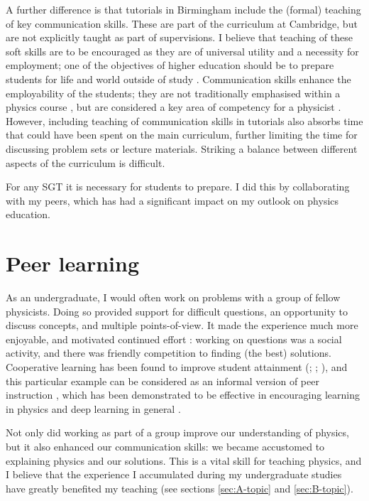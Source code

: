A further difference is that tutorials in Birmingham include the (formal) teaching of key communication skills. These are part of the curriculum at Cambridge, but are not explicitly taught as part of supervisions. %
I believe that teaching of these soft skills are to be encouraged as they are of universal utility and a necessity for employment; one of the objectives of higher education should be to prepare students for life and world outside of study \citep{Fallows2000,Harvey2000}. Communication skills enhance the employability of the students; they are not traditionally emphasised within a physics course \citep[cf.][]{Sharma2007}, but are considered a key area of competency for a physicist \citep{Gonsalves2014a}. However, including teaching of communication skills in tutorials also absorbs time that could have been spent on the main curriculum, further limiting the time for discussing problem sets or lecture materials. Striking a balance between different aspects of the curriculum is difficult.

For any SGT it is necessary for students to prepare. I did this by collaborating with my peers, which has had a significant impact on my outlook on physics education.

\section{Peer learning}\label{sec:peer}

As an undergraduate, I would often work on problems with a group of fellow physicists. Doing so provided support for difficult questions, an opportunity to discuss concepts, and multiple points-of-view. It made the experience much more enjoyable, and motivated continued effort \citep[e.g.,][chapter 1]{Roth1994,Springer1999,Falchikov2001}: working on questions was a social activity, and there was friendly competition to finding (the best) solutions. Cooperative learning has been found to improve student attainment (\citealt{Qin1995}; \citealt[chapter 2]{Falchikov2001}; \citealt{Cabrera2002}), and this particular example can be considered as an informal version of peer instruction \citep{Roth1994}, which has been demonstrated to be effective in encouraging learning in physics \citep{Springer1999,Crouch2001,Pilzer2001,Miller2006} and deep learning in general \citep{Marton1976,Wilson2005}.

Not only did working as part of a group improve our understanding of physics, but it also enhanced our communication skills: we became accustomed to explaining physics and our solutions. This is a vital skill for teaching physics, and I believe that the experience I accumulated during my undergraduate studies have greatly benefited my teaching (see sections \ref{sec:A-topic} and \ref{sec:B-topic}).


